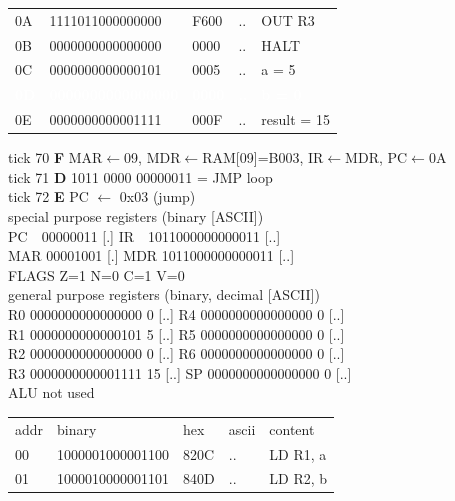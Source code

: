 \begin{tcolorbox}[stepbox, title={Instruction 23 \hfill ticks 67 to 69 \quad ST R2, b}]
{\begin{tabular}{@{}lllll@{}}
0A & 1111011000000000 & F600 & .. & OUT R3\\
0B & 0000000000000000 & 0000 & .. & HALT\\
\rowcolor{datac}0C & 0000000000000101 & 0005 & .. & a = 5\\
\rowcolor{wrt}\textcolor{white}{\textbf{0D}} & \textcolor{white}{\textbf{0000000000000000}} & \textcolor{white}{\textbf{0000}} & \textcolor{white}{\textbf{..}} & \textcolor{white}{\textbf{b = 0}}\\
\rowcolor{datac}0E & 0000000000001111 & 000F & .. & result = 15\\
\end{tabular}}
\end{tcolorbox}\hfill\begin{tcolorbox}[stepbox, title={Instruction 24 \hfill ticks 70 to 72 \quad JMP loop}]
\textcolor{dim}{tick 70} \textbf{F} MAR$\leftarrow$09, MDR$\leftarrow$RAM[09]=B003, IR$\leftarrow$MDR, PC$\leftarrow$0A\\
\textcolor{dim}{tick 71} \textbf{D} 1011 0000 00000011 = JMP loop\\
\textcolor{dim}{tick 72} \textbf{E} PC $\leftarrow$ 0x03 (jump)\\[2pt]
\textcolor{dim}{special purpose registers (binary [ASCII])}\\
PC~~00000011 [.] \hfill IR~~1011000000000011 [..]\\
MAR 00001001 [.] \hfill MDR 1011000000000011 [..]\\
FLAGS Z=1 N=0 C=1 V=0\\[2pt]
\textcolor{dim}{general purpose registers (binary, decimal [ASCII])}\\
R0 0000000000000000 0 [..] \hfill R4 0000000000000000 0 [..]\\
R1 0000000000000101 5 [..] \hfill R5 0000000000000000 0 [..]\\
R2 0000000000000000 0 [..] \hfill R6 0000000000000000 0 [..]\\
R3 0000000000001111 15 [..] \hfill SP 0000000000000000 0 [..]\\
\textcolor{dim}{ALU not used}\\[2pt]
{\setlength{\tabcolsep}{2pt}\begin{tabular}{@{}lllll@{}}
\textcolor{dim}{addr} & \textcolor{dim}{binary} & \textcolor{dim}{hex} & \textcolor{dim}{ascii} & \textcolor{dim}{content}\\
00 & 1000001000001100 & 820C & .. & LD R1, a\\
01 & 1000010000001101 & 840D & .. & LD R2, b\\

\end{tabular}}
\end{tcolorbox}
